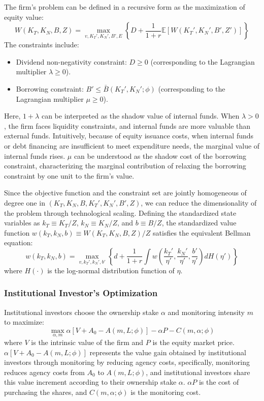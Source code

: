 \documentclass[12pt,a4paper]{article}
\begin{document}
The firm's problem can be defined in a recursive form as the maximization of equity value:
\begin{equation}
W(K_T, K_N, B, Z) = \max_{v, K_T', K_N', B', E} \left\{ D + \frac{1}{1+r} \mathbb{E} [W(K_T', K_N', B', Z')] \right\}
\end{equation}
The constraints include:
\begin{itemize}
    \item[(a)] Dividend non-negativity constraint: $D \ge 0$ (corresponding to the Lagrangian multiplier $\lambda \ge 0$).
    \item[(b)] Borrowing constraint: $B' \le \bar{B}(K_T', K_N'; \phi)$ (corresponding to the Lagrangian multiplier $\mu \ge 0$).
\end{itemize}

Here, $1 + \lambda$ can be interpreted as the shadow value of internal funds. When $\lambda > 0$, the firm faces liquidity constraints, and internal funds are more valuable than external funds. Intuitively, because of equity issuance costs, when internal funds or debt financing are insufficient to meet expenditure needs, the marginal value of internal funds rises. $\mu$ can be understood as the shadow cost of the borrowing constraint, characterizing the marginal contribution of relaxing the borrowing constraint by one unit to the firm's value.

Since the objective function and the constraint set are jointly homogeneous of degree one in $(K_T, K_N, B, K_T', K_N', B', Z)$, we can reduce the dimensionality of the problem through technological scaling. Defining the standardized state variables as $k_T \equiv K_T/Z$, $k_N \equiv K_N/Z$, and $b \equiv B/Z$, the standardized value function $w(k_T, k_N, b) \equiv W(K_T, K_N, B, Z)/Z$ satisfies the equivalent Bellman equation:
\begin{equation}
w(k_T, k_N, b) = \max_{v, k_T', k_N', b'} \left\{ d + \frac{1}{1+r} \int w \left( \frac{k_T'}{\eta'}, \frac{k_N'}{\eta'}, \frac{b'}{\eta'} \right) dH(\eta') \right\}
\end{equation}
where $H(\cdot)$ is the log-normal distribution function of $\eta$.

\subsubsection{Institutional Investor's Optimization}
Institutional investors choose the ownership stake $\alpha$ and monitoring intensity $m$ to maximize:
\begin{equation}
\max_{\alpha, m} \alpha [V + A_0 - A(m, L; \phi)] - \alpha P - C(m, \alpha; \phi)
\end{equation}
where $V$ is the intrinsic value of the firm and $P$ is the equity market price. $\alpha [V + A_0 - A(m, L; \phi)]$ represents the value gain obtained by institutional investors through monitoring by reducing agency costs, specifically, monitoring reduces agency costs from $A_0$ to $A(m, L; \phi)$, and institutional investors share this value increment according to their ownership stake $\alpha$. $\alpha P$ is the cost of purchasing the shares, and $C(m, \alpha; \phi)$ is the monitoring cost.
\end{document}
